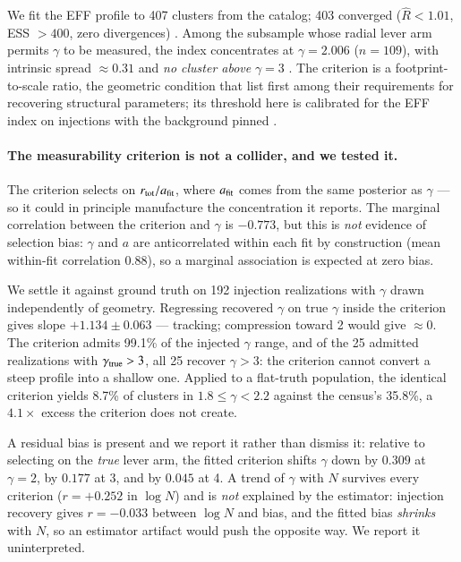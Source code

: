 \documentclass{aa}
\begin{document}
We fit the EFF profile to 407 clusters from the \citet{hunt2024} catalog; 403 converged
($\hat{R}<1.01$, ESS $>400$, zero divergences)
. Among the subsample whose radial lever arm permits $\gamma$ to be measured, the index
concentrates at $\gamma = 2.006$ ($n=109$), with intrinsic spread $\approx0.31$ and \emph{no
cluster above} $\gamma=3$
. The criterion is a footprint-to-scale ratio, the geometric condition that \citet{munoz2012} list
first among their requirements for recovering structural parameters; its threshold here is
calibrated for the EFF index on injections with the background pinned
.

\paragraph{The measurability criterion is not a collider, and we tested it.}
The criterion selects on $r_{\rm tot}/a_{\rm fit}$, where $a_{\rm fit}$ comes from the same
posterior as $\gamma$ --- so it could in principle manufacture the concentration it reports. The
marginal correlation between the criterion and $\gamma$ is $-0.773$, but this is \emph{not}
evidence of selection bias: $\gamma$ and $a$ are anticorrelated within each fit by construction
(mean within-fit correlation $0.88$), so a marginal association is expected at zero bias.

We settle it against ground truth on 192 injection realizations with $\gamma$ drawn independently
of geometry. Regressing recovered $\gamma$ on true $\gamma$ inside the criterion gives slope
$+1.134 \pm 0.063$ --- tracking; compression toward 2 would give $\approx0$. The criterion admits
99.1\% of the injected $\gamma$ range, and of the 25 admitted realizations with $\gamma_{\rm
true}>3$, all 25 recover $\gamma>3$: the criterion cannot convert a steep profile into a shallow
one. Applied to a flat-truth population, the identical criterion yields 8.7\% of clusters in
$1.8\le\gamma<2.2$ against the census's 35.8\%, a $4.1\times$ excess the criterion does not
create.

A residual bias is present and we report it rather than dismiss it: relative to selecting on the
\emph{true} lever arm, the fitted criterion shifts $\gamma$ down by $0.309$ at $\gamma=2$, by
$0.177$ at 3, and by $0.045$ at 4. A trend of $\gamma$ with $N$ survives every criterion
($r=+0.252$ in $\log N$) and is \emph{not} explained by the estimator: injection recovery gives
$r=-0.033$ between $\log N$ and bias, and the fitted bias \emph{shrinks} with $N$, so an
estimator artifact would push the opposite way. We report it uninterpreted.
\end{document}
